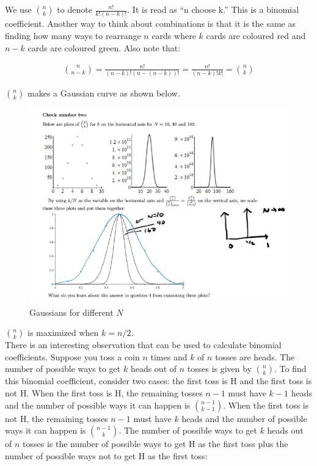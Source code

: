 \documentclass[12pt, a4paper]{article}
\begin{document}
We use $\binom{n}{k}$ to denote $\frac{n!}{k!(n-k)!}$. It is read as ``n choose k.'' This is a binomial coefficient. Another way to think about combinations is that it is the same as finding how many ways to rearrange $n$ cards where $k$ cards are coloured red and $n-k$ cards are coloured green. Also note that:

\begin{align*}
\binom{n}{n-k} = \frac{n!}{(n-k)!(n-(n-k))!} = \frac{n!}{(n-k)!k!} = \binom{n}{k}
\end{align*}

$\binom{n}{k}$ makes a Gaussian curve as shown below.

\begin{figure}[H]
\centering
\includegraphics[width=160mm]{1.png}
\caption{Gaussians for different $N$}
\end{figure}

$\binom{n}{k}$ is maximized when $k=n/2$. \\

There is an interesting observation that can be used to calculate binomial coefficients. Suppose you toss a coin $n$ times and $k$ of $n$ tosses are heads. The number of possible ways to get $k$ heads out of $n$ tosses is given by $\binom{n}{k}$. To find this binomial coefficient, consider two cases: the first toss is H and the first toss is not H. When the first toss is H, the remaining tosses $n-1$ must have $k-1$ heads and the number of possible ways it can happen is $\binom{n-1}{k-1}$. When the first toss is not H,  the remaining tosses $n-1$ must have $k$ heads and the number of possible ways it can happen is $\binom{n-1}{k}$. The number of possible ways to get $k$ heads out of $n$ tosses is the number of possible ways to get H as the first toss plus the number of possible ways not to get H as the first toss:
\end{document}
